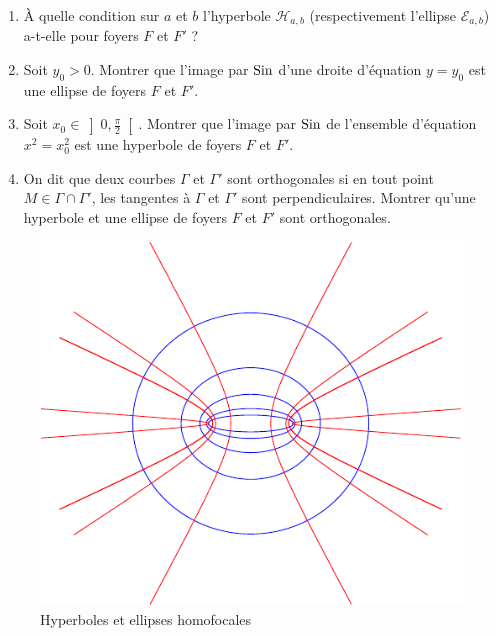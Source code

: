 \begin{enumerate}
\item \`A quelle condition sur $a$ et $b$ l'hyperbole $\mathcal H_{a,b}$ (respectivement l'ellipse $\mathcal E_{a,b}$) a-t-elle pour foyers $F$ et $F'$ ? 
\item Soit $y_0>0$. Montrer que l'image par $\textnormal{Sin}$ d'une droite d'équation $y=y_0$ est une ellipse de foyers $F$ et $F'$. 
\item Soit $x_0 \in \left]0, \frac{\pi}2\right[$. Montrer que l'image par $\textnormal{Sin}$ de l'ensemble d'équation $x^2 = x_0^2$ est une hyperbole de foyers $F$ et $F'$. 
\item On dit que deux courbes $\Gamma$ et $\Gamma' $ sont orthogonales si en tout point $M \in \Gamma \cap \Gamma'$, les tangentes à $\Gamma$ et $\Gamma'$ sont perpendiculaires.\newline
Montrer qu'une hyperbole et une ellipse de foyers $F$ et $F'$ sont orthogonales.
\end{enumerate}
\begin{figure}[h!]
 \centering
 \includegraphics{Esincosc_1.pdf}
 \caption{Hyperboles et ellipses homofocales}
 \label{fig:Esincosc_1}
\end{figure}
